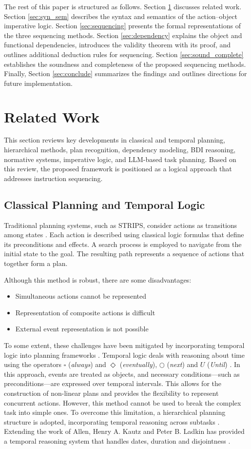 \documentclass[a4paper,11pt]{lmcs}
\begin{document}
The rest of this paper is structured as follows. Section \ref{sec:related} discusses related work. Section \ref{sec:syn_sem} describes the syntax and semantics of the action–object imperative logic. Section \ref{sec:sequencing} presents the formal representations of the three sequencing methods. Section \ref{sec:dependency} explains the object and functional dependencies, introduces the validity theorem with its proof, and outlines additional deduction rules for sequencing. Section \ref{sec:sound_complete} establishes the soundness and completeness of the proposed sequencing methods. Finally, Section \ref{sec:conclude} summarizes the findings and outlines directions for future implementation.

\section{Related Work}
\label{sec:related}
This section reviews key developments in classical and temporal planning, hierarchical methods, plan recognition, dependency modeling, BDI reasoning, normative systems, imperative logic, and LLM-based task planning. Based on this review, the proposed framework is positioned as a logical approach that addresses instruction sequencing.

\subsection*{Classical Planning and Temporal Logic}
Traditional planning systems, such as STRIPS, consider actions as transitions among states \citep{strips}. Each action is described using classical logic formulas that define its preconditions and effects. A search process is employed to navigate from the initial state to the goal. The resulting path represents a sequence of actions that together form a plan.

Although this method is robust, there are some disadvantages:
\begin{itemize}
 \item Simultaneous actions cannot be represented
 \item Representation of composite actions is difficult
 \item External event representation is not possible
\end{itemize}
To some extent, these challenges have been mitigated by incorporating temporal logic into planning frameworks \citep{allen}. Temporal logic deals with reasoning about time using the operators $\square$ (\textit{always}) and $\Diamond$ (\textit{eventually}), $\bigcirc$ (\textit{next}) and $U$ (\textit{Until}) \citep{huth}. In this approach, events are treated as objects, and necessary conditions—such as preconditions—are expressed over temporal intervals. This allows for the construction of non-linear plans and provides the flexibility to represent concurrent actions. However, this method cannot be used to break the complex task into simple ones. To overcome this limitation, a hierarchical planning structure is adopted, incorporating temporal reasoning across subtasks \citep{fei}.
Extending the work of Allen, Henry A. Kautz and Peter B. Ladkin has provided a temporal reasoning system that handles dates, duration and disjointness \citep{kautz}.
\end{document}
